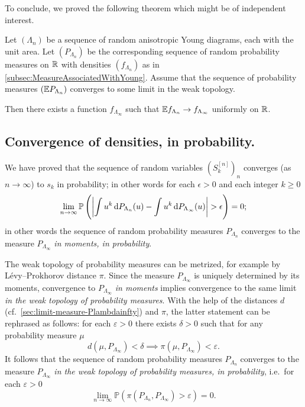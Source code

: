 \documentclass[12pt,usenames,dvipsnames,svgnames,table]{amsart}
\begin{document}
To conclude, we proved the following theorem which might be of independent interest.

\begin{theorem}
Let $(\Lambda_n)$ be a sequence of random anisotropic Young diagrams, each with the unit area.
Let $(P_{\Lambda_n})$ be the corresponding sequence of random probability measures on $\mathbb{R}$ with
densities $(f_{\Lambda_n})$ as
in \cref{subsec:MeasureAssociatedWithYoung}. Assume that
the sequence of probability measures $(\mathbb{E} P_{\Lambda_n})$ converges to some limit in the weak topology. 

Then there exists a
function $f_{\Lambda_\infty}$ such that $\mathbb{E} f_{\Lambda_n} \to
f_{\Lambda_\infty}$ uniformly on $\mathbb{R}$.
\end{theorem}

\subsection{Convergence of densities, in probability.}
We have proved that the sequence of random variables $(S_k^{[n]})_n$ converges 
(as $n\to\infty$) to $s_k$ in probability; 
in other words for each $\epsilon>0$ and each integer $k\geq 0$
\begin{equation} 
\label{eq:moments-convergence}
\lim_{n\to\infty} \mathbb{P}\left( \left| \int u^{k} \dif P_{\Lambda_n}(u)
-  
\int u^{k} \dif P_{\Lambda_\infty}(u)
\right| >
\epsilon \right) =0;
\end{equation} 
in other words the sequence of random probability measures $P_{\Lambda_n}$ converges to the measure
$P_{\Lambda_\infty}$ \emph{in moments, in probability}.

The weak topology of probability measures
can be metrized, for example by Lévy--Prokhorov distance $\pi$.
Since the measure $P_{\Lambda_\infty}$ is uniquely determined by its moments, 
convergence to $P_{\Lambda_\infty}$ \emph{in moments} implies convergence to the same limit
\emph{in the weak topology of probability measures}.
With the help of the distances $d$ (cf.~\cref{sec:limit-measure-Plambdainfty})
and $\pi$, the latter statement can be rephrased as follows:
for each $\varepsilon>0$
there exists $\delta>0$ such that for any probability measure $\mu$ 
\[  d(\mu, P_{\Lambda_\infty}) < \delta \implies 
\pi(\mu, P_{\Lambda_\infty}) < \varepsilon.
\]
It follows
that the sequence of random probability measures $P_{\Lambda_n}$ converges to the measure
$P_{\Lambda_\infty}$ \emph{in the weak topology of probability measures, in probability}, 
i.e.~for each $\varepsilon>0$
\begin{equation}
\label{eq:Levy}
\lim_{n\to\infty} \mathbb{P}\left( \pi(P_{\Lambda_n}, P_{\Lambda_\infty})  >
\varepsilon \right) =0.  
\end{equation}
\end{document}
